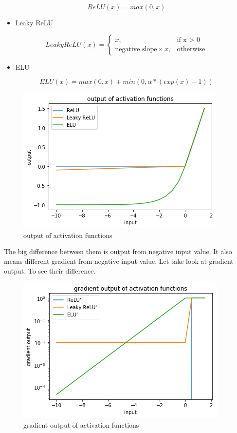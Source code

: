 \documentclass[12pt]{article}
\begin{document}
\begin{equation}
ReLU(x) = max(0, x)
\end{equation}
\begin{itemize}
\item Leaky ReLU
\end{itemize}

\begin{equation}
LeakyReLU(x) = \left\{\begin{array}{ll}
x, & \text{if  x > 0} \\
\text{negative\_slope} \times x, & \text{otherwise}
\end{array}\right.
\end{equation}

\begin{itemize}
\item ELU
\end{itemize}

\begin{equation}
ELU(x) = max(0, x) + min(0, \alpha \ast (exp(x) - 1) )
\end{equation}

\begin{figure}[H]
\centering
\includegraphics{Images/OutputActivation.png}
\caption{output of activation functions}
\end{figure}

The big difference between them is output from negative input value. It also means different gradient from negative input value. Let take look at gradient output. To see their difference.

\begin{figure}[H]
\centering
\includegraphics{Images/GradientOutputActivation.png}
\caption{gradient output of activation functions}
\end{figure}
\end{document}
